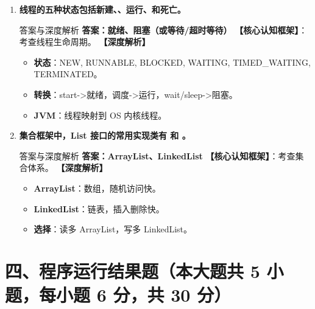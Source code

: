\documentclass[12pt, a4paper]{ctexart}
\newcommand{\blank}{\underline{\hspace{2cm}}}
\begin{document}
\begin{enumerate}[label=\arabic*.]
\item \textbf{线程的五种状态包括新建、\blank、运行、\blank 和死亡。}
\begin{bluebox}{答案与深度解析}
\textbf{答案：就绪、阻塞（或等待/超时等待）}
\textbf{【核心认知框架】}：考查线程生命周期。
\textbf{【深度解析】}
\begin{itemize}[leftmargin=*, nosep]
	\item \textbf{状态}：NEW, RUNNABLE, BLOCKED, WAITING, TIMED\_WAITING, TERMINATED。
    \item \textbf{转换}：start->就绪，调度->运行，wait/sleep->阻塞。
    \item \textbf{JVM}：线程映射到 OS 内核线程。
\end{itemize}
\end{bluebox}

\item \textbf{集合框架中，List 接口的常用实现类有 \blank 和 \blank。}
\begin{bluebox}{答案与深度解析}
\textbf{答案：ArrayList、LinkedList}
\textbf{【核心认知框架】}：考查集合体系。
\textbf{【深度解析】}
\begin{itemize}[leftmargin=*, nosep]
    \item \textbf{ArrayList}：数组，随机访问快。
    \item \textbf{LinkedList}：链表，插入删除快。
    \item \textbf{选择}：读多 ArrayList，写多 LinkedList。
\end{itemize}
\end{bluebox}
\end{enumerate}

\section*{四、程序运行结果题（本大题共 5 小题，每小题 6 分，共 30 分）}
\end{document}

